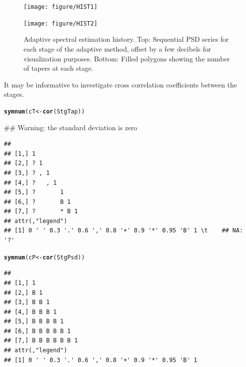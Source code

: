\documentclass{article}\usepackage{graphicx, color}
\makeatletter
\newcommand{\hlfunctioncall}[1]{\textcolor[rgb]{0.501960784313725,0,0.329411764705882}{\textbf{#1}}}%
\newenvironment{kframe}{%
 \def\at@end@of@kframe{}%
 \ifinner\ifhmode%
  \def\at@end@of@kframe{\end{minipage}}%
  \begin{minipage}{\columnwidth}%
 \fi\fi%
 \def\FrameCommand##1{\hskip\@totalleftmargin \hskip-\fboxsep
 \colorbox{shadecolor}{##1}\hskip-\fboxsep
     \hskip-\linewidth \hskip-\@totalleftmargin \hskip\columnwidth}%
 \MakeFramed {\advance\hsize-\width
   \@totalleftmargin\z@ \linewidth\hsize
   \@setminipage}}%
 {\par\unskip\endMakeFramed%
 \at@end@of@kframe}
\newenvironment{knitrout}{}{} %
\makeatother
\begin{document}
\begin{figure}[htb!]
\begin{center}
\begin{knitrout}
\color{fgcolor}
\texttt{[image: figure/HIST1]} 

\end{knitrout}

\begin{knitrout}
\color{fgcolor}
\texttt{[image: figure/HIST2]} 

\end{knitrout}

\caption{Adaptive spectral estimation history.
Top: Sequential PSD series for each stage of the adaptive method, 
offset by a few decibels for visualization purposes.
Bottom: Filled polygons showing the number of tapers at each stage.
}
\label{fig:psdhist}
\end{center}
\end{figure}

It may be informative to investigate cross correlation
coefficients between the stages.
\begin{knitrout}
\color{fgcolor}\begin{kframe}
\begin{alltt}
\hlfunctioncall{symnum}(cT <- \hlfunctioncall{cor}(StgTap))
\end{alltt}


{\ttfamily\noindent\textcolor{warningcolor}{\#\# Warning: the standard deviation is zero}}\begin{verbatim}
##                   
## [1,] 1            
## [2,] ? 1          
## [3,] ? , 1        
## [4,] ?   , 1      
## [5,] ?       1    
## [6,] ?       B 1  
## [7,] ?       * B 1
## attr(,"legend")
## [1] 0 ' ' 0.3 '.' 0.6 ',' 0.8 '+' 0.9 '*' 0.95 'B' 1 \t    ## NA: '?'
\end{verbatim}
\begin{alltt}
\hlfunctioncall{symnum}(cP <- \hlfunctioncall{cor}(StgPsd))
\end{alltt}
\begin{verbatim}
##                   
## [1,] 1            
## [2,] B 1          
## [3,] B B 1        
## [4,] B B B 1      
## [5,] B B B B 1    
## [6,] B B B B B 1  
## [7,] B B B B B B 1
## attr(,"legend")
## [1] 0 ' ' 0.3 '.' 0.6 ',' 0.8 '+' 0.9 '*' 0.95 'B' 1
\end{verbatim}
\end{kframe}
\end{knitrout}
\end{document}
